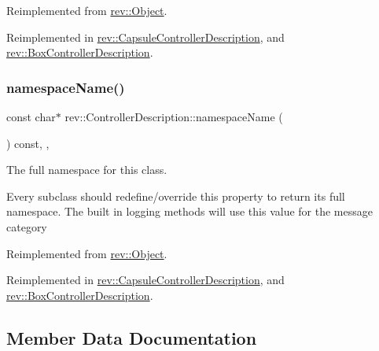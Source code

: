 Reimplemented from \mbox{\hyperlink{classrev_1_1_object_a7a2013f91169479b65cf93afdc5d9a68}{rev\+::\+Object}}.



Reimplemented in \mbox{\hyperlink{classrev_1_1_capsule_controller_description_aca7d4aff153f3db30084d730966ceb05}{rev\+::\+Capsule\+Controller\+Description}}, and \mbox{\hyperlink{classrev_1_1_box_controller_description_a88d4d2d35a8f8d38b1dd90f33dba96bd}{rev\+::\+Box\+Controller\+Description}}.

\mbox{\label{classrev_1_1_controller_description_a95ae000783dd5460060582a129c9251d}} 
\subsubsection{\texorpdfstring{namespaceName()}{namespaceName()}}
{\footnotesize\ttfamily const char$\ast$ rev\+::\+Controller\+Description\+::namespace\+Name (\begin{DoxyParamCaption}{ }\end{DoxyParamCaption}) const\hspace{0.3cm}{\ttfamily [inline]}, {\ttfamily [override]}, {\ttfamily [virtual]}}



The full namespace for this class. 

Every subclass should redefine/override this property to return its full namespace. The built in logging methods will use this value for the message category 

Reimplemented from \mbox{\hyperlink{classrev_1_1_object_aaeb638d3e10f361c56c211a318a27f3d}{rev\+::\+Object}}.



Reimplemented in \mbox{\hyperlink{classrev_1_1_capsule_controller_description_adb2e0dbf5b569df3b0536b888b0af21c}{rev\+::\+Capsule\+Controller\+Description}}, and \mbox{\hyperlink{classrev_1_1_box_controller_description_adb539380f3f2033d6d6fbfe1b36a69c8}{rev\+::\+Box\+Controller\+Description}}.



\subsection{Member Data Documentation}
\mbox{\label{classrev_1_1_controller_description_a2f7d222b7aca3fd4e7036200f5480167}} 
